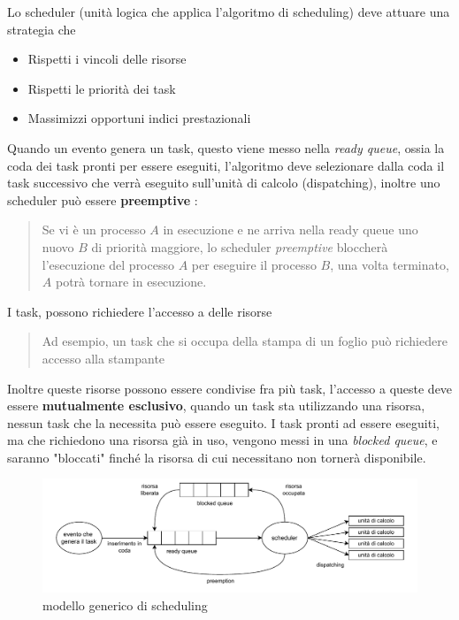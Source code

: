 \documentclass[10pt, letterpaper]{report}
\begin{document}
Lo scheduler (unità logica che applica l'algoritmo di scheduling) deve attuare una strategia che \begin{itemize}
    \item Rispetti i vincoli delle risorse 
    \item Rispetti le priorità dei task 
    \item Massimizzi opportuni indici prestazionali 
\end{itemize}
Quando un evento genera un task, questo viene messo nella \textit{ready queue}, ossia la coda 
dei task pronti per essere eseguiti, l'algoritmo deve selezionare dalla coda il task successivo che 
verrà eseguito sull'unità di calcolo (dispatching), inoltre uno scheduler può essere \textbf{preemptive} : \begin{quote}
    Se vi è un processo $A$ in esecuzione e ne arriva nella ready queue uno nuovo $B$ di priorità maggiore, lo scheduler 
    \textit{ preemptive} bloccherà l'esecuzione del processo $A$ per eseguire il processo $B$, una volta terminato, $A$ 
    potrà tornare in esecuzione.
\end{quote}
I task, possono richiedere l'accesso a delle risorse \begin{quote}
    Ad esempio, un task che si occupa della stampa di un foglio può richiedere accesso alla stampante
\end{quote}
Inoltre queste risorse possono essere condivise fra più task, l'accesso a queste deve essere \textbf{mutualmente 
esclusivo}, quando un task sta utilizzando una risorsa, nessun task che la necessita può essere eseguito. 
I task pronti ad essere eseguiti, ma che richiedono una risorsa già in uso, vengono messi in una 
\textit{blocked queue}, e saranno "bloccati" finché la risorsa di cui necessitano non tornerà disponibile.\begin{center}
   \begin{figure}[h!]
    \centering
    \includegraphics[width=1\textwidth ]{images/scheduler.pdf}
    \caption{modello generico di scheduling}
   \end{figure}
\end{center}
\flowerLine 
\end{document}
